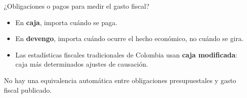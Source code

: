 \begin{frame}{¿Obligaciones o pagos para medir el gasto fiscal?}
\begin{itemize}
  \item En \textbf{caja}, importa cuándo se paga.
  \item En \textbf{devengo}, importa cuándo ocurre el hecho económico, no cuándo se gira.
  \item Las estadísticas fiscales tradicionales de Colombia usan \textbf{caja modificada}: caja más determinados ajustes de causación.
\end{itemize}
\vspace{0.7em}
No hay una equivalencia automática entre obligaciones presupuestales y gasto fiscal publicado.
\fuenteCaja
\end{frame}
